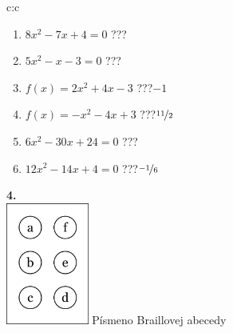 \documentclass[10pt]{report}
\begin{document}
\begin{tabular}{c:c}
\begin{minipage}[c][104.5mm][t]{0.5\linewidth}
\begin{center}
\begin{minipage}{0.79\linewidth}
\begin{center}
\begin{varwidth}{\linewidth}
\begin{enumerate}
\Large
\item $8x^2-7x+4=0$\quad \dotfill\; ???\;\dotfill {}
\item $5x^2-x-3=0$\quad \dotfill\; ???\;\dotfill {}
\item $f(x)=2x^2+4x-3$\quad \dotfill\; ???\;\dotfill \quad $-1$
\item $f(x)=-x^2-4x+3$\quad \dotfill\; ???\;\dotfill \quad $\nicefrac{11}{2}$
\item $6x^2-30x+24=0$\quad \dotfill\; ???\;\dotfill {}
\item $12x^2-14x+4=0$\quad \dotfill\; ???\;\dotfill \quad $\nicefrac{-1}{6}$
\end{enumerate}
\end{varwidth}
\end{center}
\end{minipage}
\begin{minipage}{0.20\linewidth}
\begin{center}
{\Huge\bfseries 4.} \\[2mm]
\includegraphics[height=40mm]{../images/braille.png}
{\small Písmeno Braillovej abecedy}
\end{center}
\end{minipage}
\end{center}
\end{minipage}
%
\end{tabular}
\newpage
\thispagestyle{empty}
\end{document}
